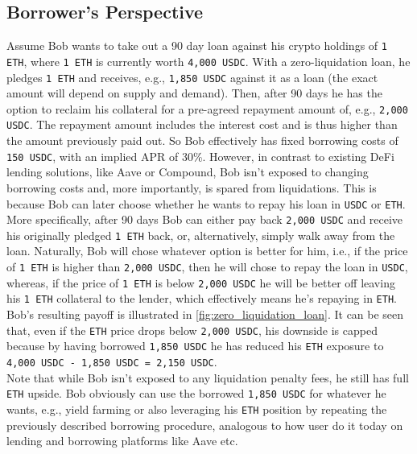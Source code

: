 \documentclass[a4paper]{article}
\begin{document}
\subsection{Borrower's Perspective}
\label{sec:borrower_perspective}
Assume Bob wants to take out a 90 day loan against his crypto holdings of \verb|1 ETH|, where \verb|1 ETH| is currently worth \verb|4,000 USDC|. With a zero-liquidation loan, he pledges \verb|1 ETH| and receives, e.g., \verb|1,850 USDC| against it as a loan (the exact amount will depend on supply and demand). Then, after 90 days he has the option to reclaim his collateral for a pre-agreed repayment amount of, e.g., \verb|2,000 USDC|. The repayment amount includes the interest cost and is thus higher than the amount previously paid out. So Bob effectively has fixed borrowing costs of \verb|150 USDC|, with an implied APR of 30\%. However, in contrast to existing DeFi lending solutions, like Aave or Compound, Bob isn't exposed to changing borrowing costs and, more importantly, is spared from liquidations. This is because Bob can later choose whether he wants to repay his loan in \verb|USDC| or \verb|ETH|.\\

More specifically, after 90 days Bob can either pay back \verb|2,000 USDC| and receive his originally pledged \verb|1 ETH| back, or, alternatively, simply walk away from the loan. Naturally, Bob will chose whatever option is better for him, i.e., if the price of \verb|1 ETH| is higher than \verb|2,000 USDC|, then he will chose to repay the loan in \verb|USDC|, whereas, if the price of \verb|1 ETH| is below \verb|2,000 USDC| he will be better off leaving his \verb|1 ETH| collateral to the lender, which effectively means he's repaying in \verb|ETH|. Bob's resulting payoff is illustrated in \cref{fig:zero_liquidation_loan}. It can be seen that, even if the \verb|ETH| price drops below \verb|2,000 USDC|, his downside is capped because by having borrowed \verb|1,850 USDC| he has reduced his \verb|ETH| exposure to \verb|4,000 USDC - 1,850 USDC = 2,150 USDC|.\\

Note that while Bob isn't exposed to any liquidation penalty fees, he still has full \verb|ETH| upside. Bob obviously can use the borrowed \verb|1,850 USDC| for whatever he wants, e.g., yield farming or also leveraging his \verb|ETH| position by repeating the previously described borrowing procedure, analogous to how user do it today on lending and borrowing platforms like Aave etc. 
\end{document}
